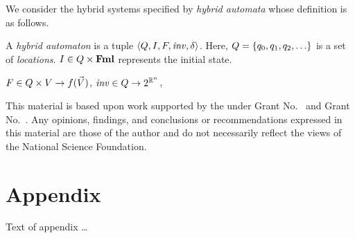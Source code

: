 \documentclass[acmsmall,review,anonymous]{acmart}\settopmatter{printfolios=true,printccs=false,printacmref=false}
\begin{document}
We consider the hybrid systems specified by \emph{hybrid automata}
whose definition is as follows.
\begin{definition}
  A \emph{hybrid automaton} is a tuple
  $\left\langle {Q,I,F,\mathit{inv},\delta} \right\rangle$.  Here,
  $Q = \left\{{q_0,q_1,q_2,\dots}\right\}$ is a set of
  \emph{locations}.  $I \in Q \times \mathbf{Fml}$ represents the
  initial state.

  $F \in Q \times V \rightarrow f(\vec{V})$,
  $\mathit{inv} \in Q \rightarrow 2^{\mathbb{R}^n}$,
\end{definition}



% 

\begin{acks}                            %
  This material is based upon work supported by the
   under Grant
  No.~ and Grant
  No.~.  Any opinions, findings, and
  conclusions or recommendations expressed in this material are those
  of the author and do not necessarily reflect the views of the
  National Science Foundation.
\end{acks}





\appendix
\section{Appendix}

Text of appendix \ldots
\end{document}
